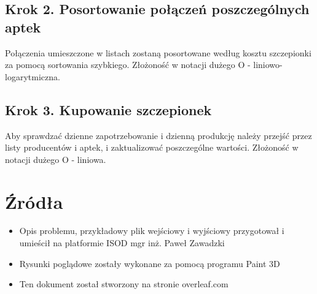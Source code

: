 \documentclass{article}
\begin{document}
\subsection{Krok 2. Posortowanie połączeń poszczególnych aptek}
Połączenia umieszczone w listach zostaną posortowane według kosztu szczepionki za pomocą sortowania szybkiego.
Złożoność w notacji dużego O - liniowo-logarytmiczna.

\subsection{Krok 3. Kupowanie szczepionek}
Aby sprawdzać dzienne zapotrzebowanie i dzienną produkcję należy przejść przez listy producentów i aptek, i zaktualizować poszczególne wartości.
Złożoność w notacji dużego O - liniowa.

\clearpage

\section{Źródła}

\begin{itemize}
    \item Opis problemu, przykładowy plik wejściowy i wyjściowy przygotował i umieścił na platformie ISOD mgr inż. Paweł Zawadzki
    \item Rysunki poglądowe zostały wykonane za pomocą programu Paint 3D
    \item Ten dokument został stworzony na stronie overleaf.com
\end{itemize}
\end{document}
